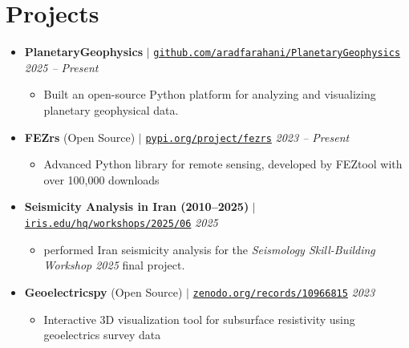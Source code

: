 \documentclass[letterpaper,10pt]{article}
\begin{document}
	\section{Projects}
	\begin{itemize}[left=0pt, label={}, topsep=1pt, partopsep=0pt, itemsep=2pt, parsep=0pt]
		\item \textbf{PlanetaryGeophysics} $|$ \normalfont\href{https://github.com/aradfarahani/PlanetaryGeophysics/}{\texttt{github.com/aradfarahani/PlanetaryGeophysics}} \hfill \textit{2025 – Present}
		\begin{itemize}[left=15pt, label=\textbullet, topsep=0pt, partopsep=0pt, itemsep=0pt, parsep=0pt]
			\item Built an open-source Python platform for analyzing and visualizing planetary geophysical data.
		\end{itemize}
		\item \textbf{FEZrs} (Open Source) $|$ \normalfont\href{https://pypi.org/project/fezrs/}{\texttt{pypi.org/project/fezrs}} \hfill \textit{2023 – Present}
		\begin{itemize}[left=15pt, label=\textbullet, topsep=0pt, partopsep=0pt, itemsep=0pt, parsep=0pt]
			\item Advanced Python library for remote sensing, developed by FEZtool with over 100,000 downloads
		\end{itemize}
		\item \textbf{Seismicity Analysis in Iran (2010–2025)} $|$ \normalfont\href{https://nbviewer.org/urls/www.iris.edu/hq/files/short_courses/2020/ssb/iran_seismicity_analysis1.ipynb}{\texttt{iris.edu/hq/workshops/2025/06}} \hfill \textit{2025}
		\begin{itemize}[left=15pt, label=\textbullet, topsep=0pt, partopsep=0pt, itemsep=0pt, parsep=0pt]
			\item performed Iran seismicity analysis for the \textit{Seismology Skill-Building Workshop 2025} final project.
		\end{itemize}
		\item \textbf{Geoelectricspy} (Open Source) $|$ \normalfont\href{https://github.com/aradfarahani/Geoelectricspy/}{\texttt{zenodo.org/records/10966815}} \hfill \textit{2023}
		\begin{itemize}[left=15pt, label=\textbullet, topsep=1pt, partopsep=0pt, itemsep=0pt, parsep=0pt]
			\item Interactive 3D visualization tool for subsurface resistivity using geoelectrics survey data
		\end{itemize}
	\end{itemize}
\end{document}
